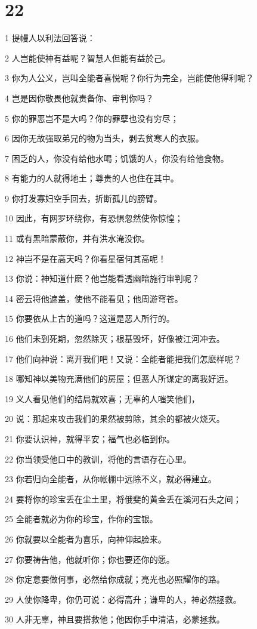 \chapter{22}

\par 1 提幔人以利法回答说：
\par 2 人岂能使神有益呢？智慧人但能有益於己。
\par 3 你为人公义，岂叫全能者喜悦呢？你行为完全，岂能使他得利呢？
\par 4 岂是因你敬畏他就责备你、审判你吗？
\par 5 你的罪恶岂不是大吗？你的罪孽也没有穷尽；
\par 6 因你无故强取弟兄的物为当头，剥去贫寒人的衣服。
\par 7 困乏的人，你没有给他水喝；饥饿的人，你没有给他食物。
\par 8 有能力的人就得地土；尊贵的人也住在其中。
\par 9 你打发寡妇空手回去，折断孤儿的膀臂。
\par 10 因此，有网罗环绕你，有恐惧忽然使你惊惶；
\par 11 或有黑暗蒙蔽你，并有洪水淹没你。
\par 12 神岂不是在高天吗？你看星宿何其高呢！
\par 13 你说：神知道什麽？他岂能看透幽暗施行审判呢？
\par 14 密云将他遮盖，使他不能看见；他周游穹苍。
\par 15 你要依从上古的道吗？这道是恶人所行的。
\par 16 他们未到死期，忽然除灭；根基毁坏，好像被江河冲去。
\par 17 他们向神说：离开我们吧！又说：全能者能把我们怎麽样呢？
\par 18 哪知神以美物充满他们的房屋；但恶人所谋定的离我好远。
\par 19 义人看见他们的结局就欢喜；无辜的人嗤笑他们，
\par 20 说：那起来攻击我们的果然被剪除，其余的都被火烧灭。
\par 21 你要认识神，就得平安；福气也必临到你。
\par 22 你当领受他口中的教训，将他的言语存在心里。
\par 23 你若归向全能者，从你帐棚中远除不义，就必得建立。
\par 24 要将你的珍宝丢在尘土里，将俄斐的黄金丢在溪河石头之间；
\par 25 全能者就必为你的珍宝，作你的宝银。
\par 26 你就要以全能者为喜乐，向神仰起脸来。
\par 27 你要祷告他，他就听你；你也要还你的愿。
\par 28 你定意要做何事，必然给你成就；亮光也必照耀你的路。
\par 29 人使你降卑，你仍可说：必得高升；谦卑的人，神必然拯救。
\par 30 人非无辜，神且要搭救他；他因你手中清洁，必蒙拯救。

